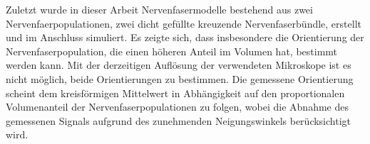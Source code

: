 Zuletzt wurde in dieser Arbeit Nervenfasermodelle bestehend aus zwei Nervenfaerpopulationen, zwei dicht gefüllte kreuzende Nervenfaserbündle, erstellt und im Anschluss simuliert.
Es zeigte sich, dass insbesondere die Orientierung der Nervenfaserpopulation, die einen höheren Anteil im Volumen hat, bestimmt werden kann.
Mit der derzeitigen Auflösung der verwendeten Mikroskope ist es nicht möglich, beide Orientierungen zu bestimmen.
Die gemessene Orientierung scheint dem kreisförmigen Mittelwert in Abhängigkeit auf den proportionalen Volumenanteil der Nervenfaserpopulationen zu folgen, wobei die Abnahme des gemessenen Signals aufgrund des zunehmenden Neigungswinkels berücksichtigt wird.